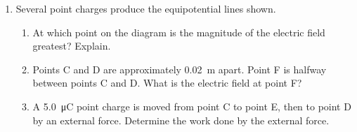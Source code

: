 \documentclass{../../oss-apphys}
\begin{document}
\begin{enumerate}[leftmargin=15pt]
\item Several point charges produce the equipotential lines shown.
  \begin{enumerate}[noitemsep]
  \item At which point on the diagram is the magnitude of the electric field
    greatest? Explain.
  \item Points C and D are approximately \SI{0.02}{\metre} apart. Point F is
    halfway between points C and D. What is the electric field at point F?
  \item A \SI{5.0}{\micro\coulomb} point charge is moved from point C to point
    E, then to point D by an external force. Determine the work done by the
    external force.
  \end{enumerate}
\end{enumerate}
\end{document}
